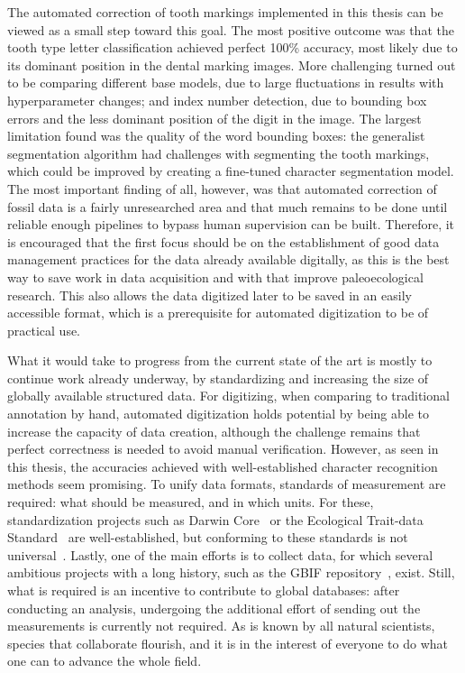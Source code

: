 \documentclass[english,twoside,openright]{UH_DS_MSc}
\begin{document}
The automated correction of tooth markings implemented in this thesis can be viewed as a small step toward this goal. The most positive outcome was that the tooth type letter classification achieved perfect 100\% accuracy, most likely due to its dominant position in the dental marking images. More challenging turned out to be comparing different base models, due to large fluctuations in results with hyperparameter changes; and index number detection, due to bounding box errors and the less dominant position of the digit in the image. The largest limitation found was the quality of the word bounding boxes: the generalist segmentation algorithm had challenges with segmenting the tooth markings, which could be improved by creating a fine-tuned character segmentation model. The most important finding of all, however, was that automated correction of fossil data is a fairly unresearched area and that much remains to be done until reliable enough pipelines to bypass human supervision can be built. Therefore, it is encouraged that the first focus should be on the establishment of good data management practices for the data already available digitally, as this is the best way to save work in data acquisition and with that improve paleoecological research. This also allows the data digitized later to be saved in an easily accessible format, which is a prerequisite for automated digitization to be of practical use.

What it would take to progress from the current state of the art is mostly to continue work already underway, by standardizing and increasing the size of globally available structured data.
For digitizing, when comparing to traditional annotation by hand, automated digitization holds potential by being able to increase the capacity of data creation, although the challenge remains that perfect correctness is needed to avoid manual verification. However, as seen in this thesis, the accuracies achieved with well-established character recognition methods seem promising.
To unify data formats, standards of measurement are required: what should be measured, and in which units. For these, standardization projects such as Darwin Core~\cite{darwincore} or the Ecological Trait-data Standard~\cite{ets-trait-data-standard} are well-established, but conforming to these standards is not universal~\cite{groomImprovedStandardizationTranscribed2019}.
Lastly, one of the main efforts is to collect data, for which several ambitious projects with a long history, such as the GBIF repository~\cite{gbif}, exist.
 Still, what is required is an incentive to contribute to global databases: after 
conducting an analysis, undergoing the additional effort of sending out the measurements is currently not required. As is known by all natural scientists, species that collaborate flourish, and it is in the interest of everyone to do what one can to advance the whole field.
\end{document}
